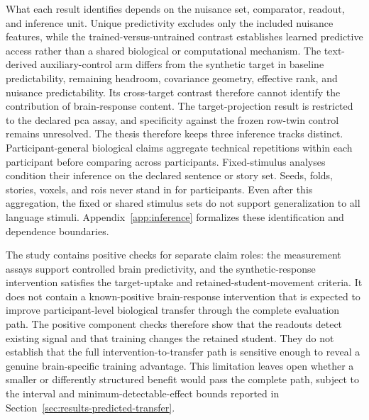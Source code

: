 What each result identifies depends on the nuisance set, comparator, readout, and inference unit.
Unique predictivity excludes only the included nuisance features, while the trained-versus-untrained contrast establishes learned predictive access rather than a shared biological or computational mechanism.
The text-derived auxiliary-control arm differs from the synthetic target in baseline predictability, remaining headroom, covariance geometry, effective rank, and nuisance predictability.
Its cross-target contrast therefore cannot identify the contribution of brain-response content.
The target-projection result is restricted to the declared \ac{pca} assay, and specificity against the frozen row-twin control remains unresolved.
The thesis therefore keeps three inference tracks distinct.
Participant-general biological claims aggregate technical repetitions within each participant before comparing across participants.
Fixed-stimulus analyses condition their inference on the declared sentence or story set.
Seeds, folds, stories, voxels, and \acp{roi} never stand in for participants.
Even after this aggregation, the fixed or shared stimulus sets do not support generalization to all language stimuli.
Appendix~\ref{app:inference} formalizes these identification and dependence boundaries.

The study contains positive checks for separate claim roles: the measurement assays support controlled brain predictivity, and the synthetic-response intervention satisfies the target-uptake and retained-student-movement criteria.
It does not contain a known-positive brain-response intervention that is expected to improve participant-level biological transfer through the complete evaluation path.
The positive component checks therefore show that the readouts detect existing signal and that training changes the retained student.
They do not establish that the full intervention-to-transfer path is sensitive enough to reveal a genuine brain-specific training advantage.
This limitation leaves open whether a smaller or differently structured benefit would pass the complete path, subject to the interval and minimum-detectable-effect bounds reported in Section~\ref{sec:results-predicted-transfer}.

